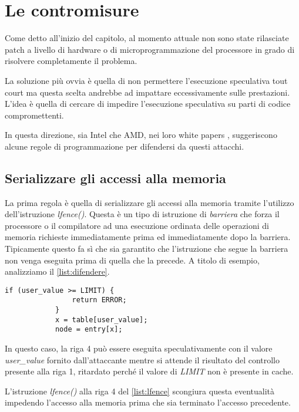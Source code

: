 	\section{Le contromisure}
		Come detto all'inizio del capitolo, al momento attuale non sono state rilasciate patch a livello di hardware o di microprogrammazione del processore in grado di risolvere completamente il problema.
		
		La soluzione più ovvia è quella di non permettere l'esecuzione speculativa tout court ma questa scelta andrebbe ad impattare eccessivamente sulle prestazioni. L'idea è quella di cercare di impedire l'esecuzione speculativa su parti di codice compromettenti.
		
		In questa direzione, sia Intel che AMD, nei loro white papers \cite{AMD2018speculation,intel2018speculative}, suggeriscono alcune regole di programmazione per difendersi da questi attacchi.
		
		\subsection{Serializzare gli accessi alla memoria}
		
		La prima regola è quella di serializzare gli accessi alla memoria tramite l'utilizzo dell'istruzione \emph{lfence()}. Questa è un tipo di istruzione di \emph{barriera} che forza il processore o il compilatore ad una esecuzione ordinata delle operazioni di memoria richieste immediatamente prima ed immediatamente dopo la barriera. Tipicamente questo fa sì che sia garantito che l'istruzione che segue la barriera non venga eseguita prima di quella che la precede. A titolo di esempio, analizziamo il \cref{list:difendere}.
		
		\begin{lstlisting}[caption={Codice da difendere},label={list:difendere}]
			if (user_value >= LIMIT) {
				return ERROR;
			} 
			x = table[user_value]; 
			node = entry[x];
		\end{lstlisting}
		
		In questo caso, la riga 4 può essere eseguita speculativamente con il valore \emph{user\_value} fornito dall'attaccante mentre si attende il risultato del controllo presente alla riga 1, ritardato perché il valore di \emph{LIMIT} non è presente in cache. 
		
		L'istruzione \emph{lfence()} alla riga 4 del \cref{list:lfence} scongiura questa eventualità impedendo l'accesso alla memoria prima che sia terminato l'accesso precedente.
		
